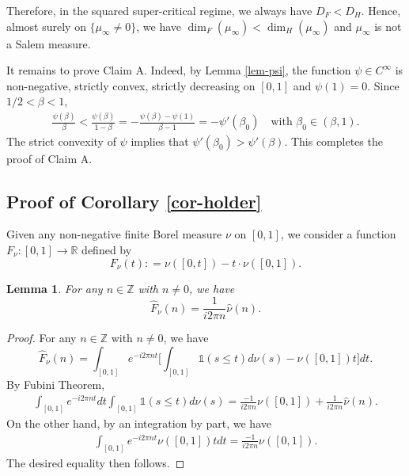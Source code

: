 \documentclass[12pt]{amsart}
\newtheorem{lemma}[theorem]{Lemma}
\theoremstyle{definition}
\theoremstyle{remark}
\newcommand{\R}{\mathbb{R}}
\newcommand{\Z}{\mathbb{Z}}
\numberwithin{equation}{section}
\begin{document}
Therefore, in the squared super-critical regime,  we always have $D_F< D_H$. Hence, almost surely on $\{\mu_\infty\ne 0\}$, we have  
$
\dim_F(\mu_\infty)< \dim_H(\mu_\infty)
$ and $\mu_\infty$ is not a Salem measure. 

It remains to prove Claim A.  Indeed, by Lemma \ref{lem-psi},  the function $\psi \in C^\infty$   is non-negative,  strictly convex,  strictly decreasing on $[0,1]$ and   $\psi(1) = 0$.    Since $1/2< \beta<1$, 
\begin{align*}
\frac{\psi(\beta)}{\beta} < \frac{\psi(\beta)}{1-\beta}   =  - \frac{\psi(\beta) - \psi(1)}{ \beta -1} = - \psi'(\beta_0) \quad \text{with $\beta_0\in (\beta, 1)$}.  
\end{align*}
The strict convexity of $\psi$ implies that $\psi'(\beta_0) > \psi'(\beta)$. This completes the proof of Claim A. 



\subsection{Proof of Corollary \ref{cor-holder}}\label{sec-cor-holder}

Given any non-negative finite Borel measure $\nu$ on $[0,1]$,   we consider a  function   $F_\nu: [0,1]\rightarrow \R$ defined by  
\[
F_\nu(t): = \nu([0,t]) -   t \cdot \nu([0,1]). 
\]

\begin{lemma}\label{lem-F}
For any $n\in \Z$ with $n \ne 0$,  we have 
\[
\widehat{F}_\nu(n)=  \frac{1}{ i2\pi n } \widehat{\nu}(n). 
\]
\end{lemma}

\begin{proof}
For any $n\in \Z$ with $n\ne 0$, we have 
\[
\widehat{F}_\nu(n)  = \int_{[0,1]} e^{- i 2 \pi n t} \Big[ \int_{[0,1]} \mathds{1}(s\le t) d\nu(s) -    \nu([0,1]) t\Big] dt. 
\]
By Fubini Theorem, 
\begin{align*}
 \int_{[0,1]} e^{- i 2 \pi n t} dt \int_{[0,1]} \mathds{1}(s\le t) d\nu(s)  = \frac{-1}{ i 2 \pi n} \nu([0,1])    + \frac{1}{ i2\pi n } \widehat{\nu}(n) .
\end{align*}
On the other hand, by an integration by part, we have 
\begin{align*}
\int_{[0,1]} e^{- i 2 \pi n t}   \nu([0,1]) t dt =\frac{-1}{ i 2 \pi n} \nu([0,1]). 
\end{align*}
The desired equality then follows. 
\end{proof}
\end{document}
